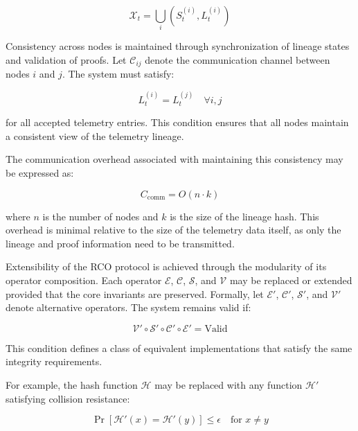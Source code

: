 \begin{equation}
\mathcal{X}_t = \bigcup_{i} (S_t^{(i)}, L_t^{(i)})
\end{equation}

Consistency across nodes is maintained through synchronization of lineage states and validation of proofs. Let $\mathcal{C}_{ij}$ denote the communication channel between nodes $i$ and $j$. The system must satisfy:

\begin{equation}
L_t^{(i)} = L_t^{(j)} \quad \forall i,j
\end{equation}

for all accepted telemetry entries. This condition ensures that all nodes maintain a consistent view of the telemetry lineage.

The communication overhead associated with maintaining this consistency may be expressed as:

\begin{equation}
C_{\text{comm}} = O(n \cdot k)
\end{equation}

where $n$ is the number of nodes and $k$ is the size of the lineage hash. This overhead is minimal relative to the size of the telemetry data itself, as only the lineage and proof information need to be transmitted.

Extensibility of the RCO protocol is achieved through the modularity of its operator composition. Each operator $\mathcal{E}$, $\mathcal{C}$, $\mathcal{S}$, and $\mathcal{V}$ may be replaced or extended provided that the core invariants are preserved. Formally, let $\mathcal{E}'$, $\mathcal{C}'$, $\mathcal{S}'$, and $\mathcal{V}'$ denote alternative operators. The system remains valid if:

\begin{equation}
\mathcal{V}' \circ \mathcal{S}' \circ \mathcal{C}' \circ \mathcal{E}' = \text{Valid}
\end{equation}

This condition defines a class of equivalent implementations that satisfy the same integrity requirements.

For example, the hash function $\mathcal{H}$ may be replaced with any function $\mathcal{H}'$ satisfying collision resistance:

\begin{equation}
\Pr[\mathcal{H}'(x) = \mathcal{H}'(y)] \leq \epsilon \quad \text{for } x \neq y
\end{equation}

